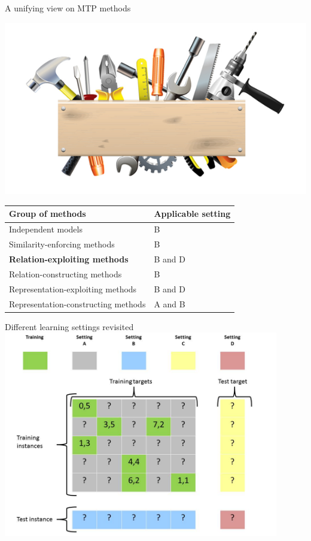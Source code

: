 \documentclass[]{beamer}
\renewcommand{\alert}[1]{\textbf{\color{putblue} #1}}
\begin{document}
\begin{frame}{A unifying view on MTP methods}

\begin{center}
\includegraphics[scale=0.3]{pics/tools}

\begin{tabular}{ll}
\hline
Group of methods & Applicable setting \\
\hline
\hline
Independent models & B \\
Similarity-enforcing methods & B   \\ 
\alert{Relation-exploiting methods} & B and D  \\
Relation-constructing methods & B  \\
Representation-exploiting methods & B and D \\
Representation-constructing methods & A and B \\
\hline  
\end{tabular}
\end{center}
\end{frame}

\begin{frame}{Different learning settings revisited}
   \center
	\vspace{0.4cm}
   \includegraphics[width=0.9\textwidth]{Figures/pictures/Slide16} %
\end{frame}
\end{document}

